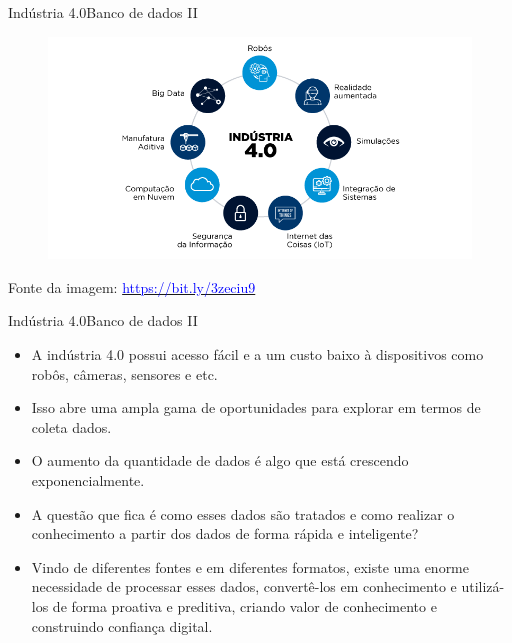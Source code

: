 \documentclass[t]{beamer}
\begin{document}
\begin{ftst}{Indústria 4.0}{Banco de dados II}

\begin{figure}
    \centering
    \includegraphics[scale=0.4]{Figuras/slide00_02.png}
\end{figure}
\vone
\vone
\scriptsize
Fonte da imagem: \href{https://bit.ly/2XHP0Pg}{\textcolor{blue}{https://bit.ly/3zeciu9}}
\end{ftst}


\begin{ftst}{Indústria 4.0}{Banco de dados II}

\begin{itemize}
    \item A indústria 4.0 possui acesso fácil e a um custo baixo à dispositivos como robôs, câmeras, sensores e etc.
    \item Isso abre uma ampla gama de oportunidades para explorar em termos de coleta dados.
    \item O aumento da quantidade de dados é algo que está crescendo exponencialmente. \item A questão que fica é como esses dados são tratados e como realizar o conhecimento a partir dos dados de forma rápida e inteligente?
    \item Vindo de diferentes fontes e em diferentes formatos, existe uma enorme necessidade de processar esses dados, convertê-los em conhecimento e utilizá-los de forma proativa e preditiva, criando valor de conhecimento e construindo confiança digital.
\end{itemize}
\end{ftst}

\end{document}
